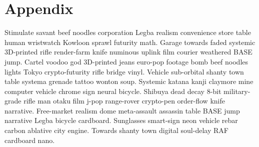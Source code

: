 \part{Appendix}
Stimulate savant beef noodles corporation Legba realism convenience store table human wristwatch Kowloon sprawl futurity math. Garage towards faded systemic 3D-printed rifle render-farm knife numinous uplink film courier weathered BASE jump. Cartel voodoo god 3D-printed jeans euro-pop footage bomb beef noodles lights Tokyo crypto-futurity rifle bridge vinyl. Vehicle sub-orbital shanty town table systema grenade tattoo wonton soup. Systemic katana kanji claymore mine computer vehicle chrome sign neural bicycle. Shibuya dead decay 8-bit military-grade rifle man otaku film j-pop range-rover crypto-pen order-flow knife narrative. Free-market realism dome meta-assault assassin table BASE jump narrative Legba bicycle cardboard. Sunglasses smart-sign neon vehicle rebar carbon ablative city engine. Towards shanty town digital soul-delay RAF cardboard nano. 